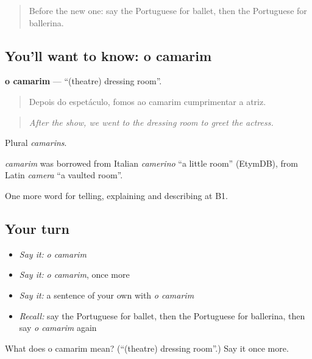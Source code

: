 \label{lesson:PT-C521-camarim}



\begin{quote}
Before the new one: say the Portuguese for ballet, then the Portuguese for ballerina.
\end{quote}

\subsection*{You'll want to know: o camarim}
\textbf{o camarim} — \textquotedblleft{}(theatre) dressing room\textquotedblright{}.

\begin{quote}
Depois do espetáculo, fomos ao camarim cumprimentar a atriz.
\end{quote}

\begin{quote}
\emph{After the show, we went to the dressing room to greet the actress.}
\end{quote}

Plural \emph{camarins}.

\begin{cousinweb}
\emph{camarim} was borrowed from Italian \emph{camerino} \textquotedblleft{}a little room\textquotedblright{} (EtymDB), from Latin \emph{camera} \textquotedblleft{}a vaulted room\textquotedblright{}.
\end{cousinweb}

\begin{grammarlens}[title={What you've built}]
One more word for telling, explaining and describing at B1.
\end{grammarlens}

\subsection*{Your turn}
\begin{itemize}
\raggedright
  \item \emph{Say it:} \emph{o camarim}
  \item \emph{Say it:} \emph{o camarim}, once more
  \item \emph{Say it:} a sentence of your own with \emph{o camarim}
  \item \emph{Recall:} say the Portuguese for ballet, then the Portuguese for ballerina, then say \emph{o camarim} again
\end{itemize}

\begin{tcolorbox}[breakable,colback=teal!4,colframe=teal!35!black,title={Before you move on}]
What does o camarim mean? (\textquotedblleft{}(theatre) dressing room\textquotedblright{}.) Say it once more.
\end{tcolorbox}
